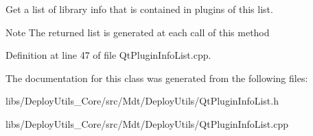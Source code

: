Get a list of library info that is contained in plugins of this list. 

\begin{DoxyNote}{Note}
The returned list is generated at each call of this method 
\end{DoxyNote}


Definition at line 47 of file Qt\+Plugin\+Info\+List.\+cpp.



The documentation for this class was generated from the following files\+:\begin{DoxyCompactItemize}
\item 
libs/\+Deploy\+Utils\+\_\+\+Core/src/\+Mdt/\+Deploy\+Utils/Qt\+Plugin\+Info\+List.\+h\item 
libs/\+Deploy\+Utils\+\_\+\+Core/src/\+Mdt/\+Deploy\+Utils/Qt\+Plugin\+Info\+List.\+cpp\end{DoxyCompactItemize}
